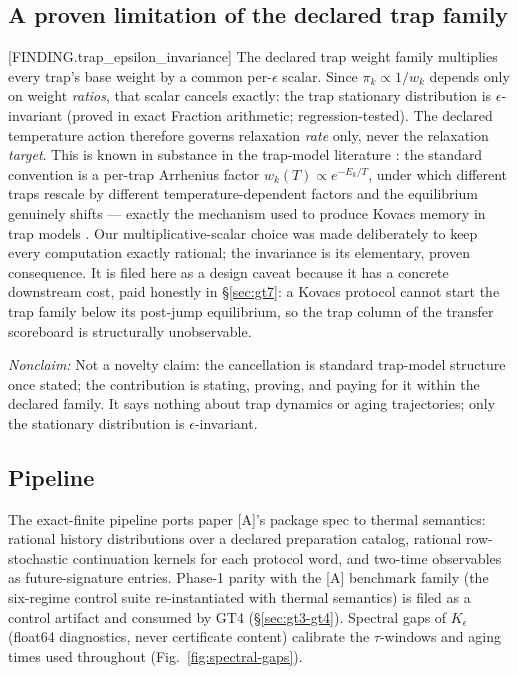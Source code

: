 \documentclass[11pt]{article}
\newcommand{\claimref}[2]{[#1]}
\newcommand{\sbtcite}[1]{\cite{#1}}
\newcommand{\nonclaim}[1]{\par\noindent\textit{Nonclaim:} #1\par}
\theoremstyle{definition}
\begin{document}
\subsection{A proven limitation of the declared trap family}

\claimref{FINDING.trap\_epsilon\_invariance}{671a28b4a4a9d812a1a6cb6e0083fc23ac01360c6ef5f6327b99de6560c153c2}
The declared trap weight family multiplies every trap's base weight by a common per-$\epsilon$
scalar. Since $\pi_k \propto 1/w_k$ depends only on weight \emph{ratios}, that scalar cancels
exactly: the trap stationary distribution is $\epsilon$-invariant (proved in exact Fraction
arithmetic; regression-tested). The declared temperature action therefore governs relaxation
\emph{rate} only, never the relaxation \emph{target}. This is known in substance in the trap-model
literature
\cite{bouchaud-1992,monthus-bouchaud-1996,diezemann-heuer-2011,bertin-bouchaud-drouffe-godreche-2003}:
the standard convention is a per-trap Arrhenius factor $w_k(T) \propto e^{-E_k/T}$, under which
different traps rescale by different temperature-dependent factors and the equilibrium genuinely
shifts --- exactly the mechanism used to produce Kovacs memory in trap models
\cite{diezemann-heuer-2011,bertin-bouchaud-drouffe-godreche-2003}. Our multiplicative-scalar
choice was made deliberately to keep every computation exactly rational; the invariance is its
elementary, proven consequence. It is filed here as a design caveat because it has a concrete
downstream cost, paid honestly in \S\ref{sec:gt7}: a Kovacs protocol cannot start the trap family
below its post-jump equilibrium, so the trap column of the transfer scoreboard is structurally
unobservable.

\nonclaim{Not a novelty claim: the cancellation is standard trap-model structure once stated; the
  contribution is stating, proving, and paying for it within the declared family. It says nothing
  about trap dynamics or aging trajectories; only the stationary distribution is
  $\epsilon$-invariant.}

\subsection{Pipeline}

The exact-finite pipeline ports paper [A]'s package spec \sbtcite{sbt-paper-a} to thermal
semantics: rational history distributions over a declared preparation catalog, rational
row-stochastic continuation kernels for each protocol word, and two-time observables as
future-signature entries. Phase-1 parity with the [A] benchmark family (the six-regime control
suite re-instantiated with thermal semantics) is filed as a control artifact and consumed by GT4
(\S\ref{sec:gt3-gt4}). Spectral gaps of $K_\epsilon$ (float64 diagnostics, never certificate
content) calibrate the $\tau$-windows and aging times used throughout
(Fig.~\ref{fig:spectral-gaps}).
\end{document}
